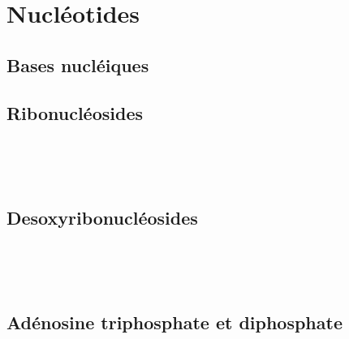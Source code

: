 \section{Nucléotides}

\subsection{Bases nucléiques}

\begin{boiteCodeTex}{}
   \hspace*{-20pt}
   \hspace*{-20pt}
\end{boiteCodeTex}

\subsection{Ribonucléosides}

\begin{boiteCodeTex}{}
  \chemfig{!\adenosine}
  \chemfig{!\cytidine} 
  \chemfig{!\guanosine} \\[8pt]
  \chemfig{!\thymidine}
  \chemfig{!\uridine}  
\end{boiteCodeTex}

\begin{boiteCodeTex}{}
  \chemfig{!\adenosineHaw}
  \chemfig{!\cytidineHaw} 
  \chemfig{!\guanosineHaw} \\[8pt]
  \chemfig{!\thymidineHaw}
  \chemfig{!\uridineHaw}  
\end{boiteCodeTex}

\subsection{Desoxyribonucléosides}

\begin{boiteCodeTex}{}
  \chemfig{!\desoxyAdenosine}
  \chemfig{!\desoxyCytidine} 
  \chemfig{!\desoxyGuanosine} \\[8pt]
  \chemfig{!\desoxyThymidine}
  \chemfig{!\desoxyUridine}  
\end{boiteCodeTex}

\begin{boiteCodeTex}{}
  \chemfig{!\desoxyAdenosineHaw}
  \chemfig{!\desoxyCytidineHaw} 
  \chemfig{!\desoxyGuanosineHaw} \\[8pt]
  \chemfig{!\desoxyThymidineHaw}
  \chemfig{!\desoxyUridineHaw}  
\end{boiteCodeTex}

\subsection{Adénosine triphosphate et diphosphate}
\begin{boiteCodeTex}{}
  \chemfig{!\ADP}
  \chemfig{!\ATP}
\end{boiteCodeTex}

\begin{boiteCodeTex}{}
  \chemfig{!\ADPHaw}
  \chemfig{!\ATPHaw}
\end{boiteCodeTex}
